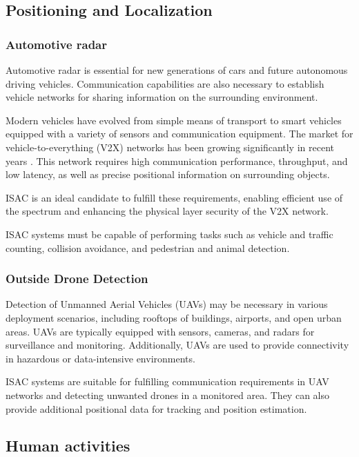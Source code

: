 	\subsection{Positioning and Localization}
	
	\subsubsection{Automotive radar}
	
	Automotive radar is essential for new generations of cars and future autonomous driving vehicles.
	Communication capabilities are also necessary to establish vehicle networks for sharing information on the surrounding environment.
	
	Modern vehicles have evolved from simple means of transport to smart vehicles equipped with a variety of sensors and communication equipment.
	The market for vehicle-to-everything (V2X) networks has been growing significantly in recent years \cite{Liu_Masouros_2021}.
	This network requires high communication performance, throughput, and low latency, as well as precise positional information on surrounding objects.
	
	ISAC is an ideal candidate to fulfill these requirements, enabling efficient use of the spectrum and enhancing the physical layer security of the V2X network.
	
	ISAC systems must be capable of performing tasks such as vehicle and traffic counting, collision avoidance, and pedestrian and animal detection.
	
	\subsubsection{Outside Drone Detection}
	
	Detection of Unmanned Aerial Vehicles (UAVs) may be necessary in various deployment scenarios, including rooftops of buildings, airports, and open urban areas.
	UAVs are typically equipped with sensors, cameras, and radars for surveillance and monitoring. Additionally, UAVs are used to provide connectivity in hazardous or data-intensive environments.

	ISAC systems are suitable for fulfilling communication requirements in UAV networks and detecting unwanted drones in a monitored area. They can also provide additional positional data for tracking and position estimation.
	
	\subsection{Human activities}
	

